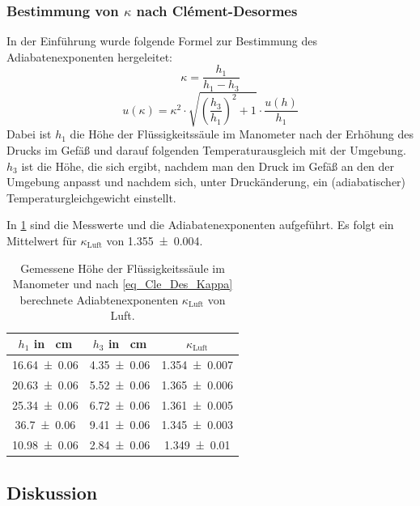 \documentclass[
	a4paper,
	12pt,
	pagesize,
	ngerman
]{scrartcl}
\begin{document}
	
	
	\subsubsection{Bestimmung von $\kappa$ nach Clément-Desormes}
	In der Einführung wurde folgende Formel zur Bestimmung des Adiabatenexponenten hergeleitet:
	\begin{equation}
		\kappa = \frac{h_1}{h_1-h_3}
		\label{eq_Cle_Des_Kappa}
	\end{equation}
	\begin{equation}	
		u(\kappa) = \kappa^2\cdot \sqrt{\left(\frac{h_3}{h_1}\right)^2+1} \cdot \frac{u(h)}{h_1}
	\end{equation}
	Dabei ist $h_1$ die Höhe der Flüssigkeitssäule im Manometer nach der Erhöhung des Drucks im Gefäß und darauf folgenden Temperaturausgleich mit der Umgebung. 
	$h_3$ ist die Höhe, die sich ergibt, nachdem man den Druck im Gefäß an den der Umgebung anpasst und nachdem sich, unter Druckänderung, ein (adiabatischer) Temperaturgleichgewicht einstellt.
	
	In \cref{tab_Manometer} sind die Messwerte und die Adiabatenexponenten aufgeführt.
	Es folgt ein Mittelwert für $\kappa_\text{Luft}$ von \SI{1,355+-0,004}{}.
	\begin{table}[H]
		\centering
		\begin{tabular}{ c | c | c }
			$h_1$ in \SI{}{cm} & $h_3$ in \SI{}{cm}  & $\kappa_\text{Luft}$\\ \hline
			\SI{16,64+-0,06}{}&\SI{4,35+-0,06}{} & \SI{1,354+-0,007}{}\\
			\SI{20,63+-0,06}{}&\SI{5,52+-0,06}{}& \SI{1,365+-0,006}{}\\
			\SI{25,34+-0,06}{}&\SI{6,72+-0,06}{}& \SI{1,361+-0,005}{}\\
			\SI{36,7+-0,06}{}&\SI{9,41+-0,06}{}& \SI{1,345+-0,003}{}\\
			\SI{10,98+-0,06}{}&\SI{2,84+-0,06}{}& \SI{1,349+-0,01}{}\\
		\end{tabular}
		\caption{Gemessene Höhe der Flüssigkeitssäule im Manometer und nach \cref{eq_Cle_Des_Kappa} berechnete Adiabtenexponenten $\kappa_\text{Luft}$ von Luft.}
		\label{tab_Manometer} 
	\end{table}
	\subsection{Diskussion}
	
\end{document}
